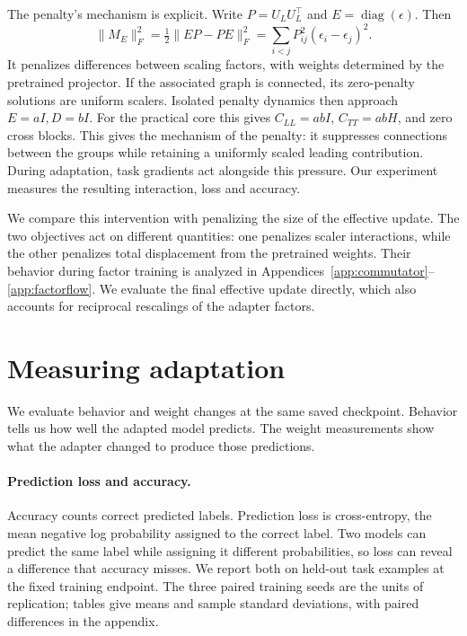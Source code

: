 \documentclass{article}
\newcommand{\diag}{\operatorname{diag}}
\begin{document}
The penalty's mechanism is explicit. Write $P=U_LU_L^\top$ and $E=\diag(\epsilon)$. Then
\begin{equation}
\|M_E\|_F^2=\tfrac12\|EP-PE\|_F^2
=\sum_{i<j}P_{ij}^2(\epsilon_i-\epsilon_j)^2.
\label{eq:commutator}
\end{equation}
It penalizes differences between scaling factors, with weights determined by the pretrained projector. If the associated graph is connected, its zero-penalty solutions are uniform scalers. Isolated penalty dynamics then approach $E=aI,D=bI$. For the practical core this gives $C_{LL}=abI$, $C_{TT}=abH$, and zero cross blocks. This gives the mechanism of the penalty: it suppresses connections between the groups while retaining a uniformly scaled leading contribution. During adaptation, task gradients act alongside this pressure. Our experiment measures the resulting interaction, loss and accuracy.

We compare this intervention with penalizing the size of the effective update. The two objectives act on different quantities: one penalizes scaler interactions, while the other penalizes total displacement from the pretrained weights. Their behavior during factor training is analyzed in Appendices~\ref{app:commutator}--\ref{app:factorflow}. We evaluate the final effective update directly, which also accounts for reciprocal rescalings of the adapter factors.

\section{Measuring adaptation}
\label{sec:measurement}

We evaluate behavior and weight changes at the same saved checkpoint. Behavior tells us how well the adapted model predicts. The weight measurements show what the adapter changed to produce those predictions.

\paragraph{Prediction loss and accuracy.}
Accuracy counts correct predicted labels. Prediction loss is cross-entropy, the mean negative log probability assigned to the correct label. Two models can predict the same label while assigning it different probabilities, so loss can reveal a difference that accuracy misses. We report both on held-out task examples at the fixed training endpoint. The three paired training seeds are the units of replication; tables give means and sample standard deviations, with paired differences in the appendix.
\end{document}
